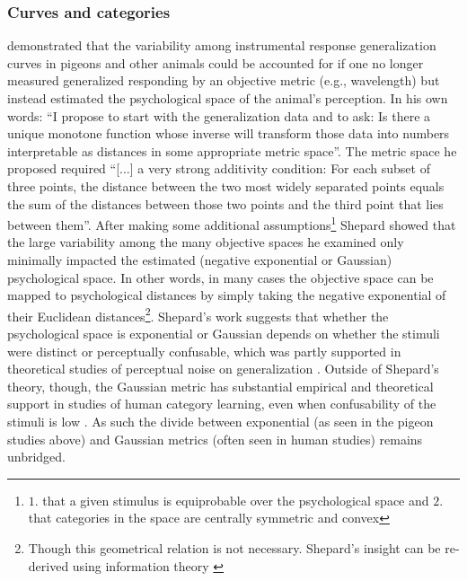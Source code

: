 \subsubsection{Curves and categories}
\label{subsub:curves}
\citet{Shepard:1987p9102} demonstrated that the variability among instrumental response generalization curves in pigeons and other animals could be accounted for if one no longer measured generalized responding by an objective metric (e.g., wavelength) but instead estimated the psychological space of the animal's perception.  In his own words: ``I propose to start with the generalization data and to ask: Is there a unique monotone function whose inverse will transform those data into numbers interpretable as distances in some appropriate metric space''. The metric space he proposed required ``[...] a very strong additivity condition: For each subset of three points, the distance between the two most widely separated points equals the sum of the distances between those two points and the third point that lies between them''.  After making some additional assumptions\footnote{
    $1.$ that a given stimulus is equiprobable over the psychological space and $2.$ that categories in the space are centrally symmetric and convex
} Shepard showed that the large variability among the many objective spaces he examined only minimally impacted the estimated (negative exponential or Gaussian) psychological space.  In other words, in many cases the objective space can be mapped to psychological distances by simply taking the negative exponential of their Euclidean distances\footnote{
    Though this geometrical relation is not necessary.  Shepard's insight can be re-derived using information theory \citep{Chatera:2003p9103}}.  
    Shepard's work suggests that whether the psychological space is exponential or Gaussian depends on whether the stimuli were distinct or perceptually confusable, which was partly supported in theoretical studies of perceptual noise on generalization \citep{Ennis:1988p9359}.  Outside of Shepard's theory, though, the Gaussian metric has substantial empirical and theoretical support in studies of human category learning, even when confusability of the stimuli is low \citep{Nosofsky:1985p9356,Medin:1978p9358}.  As such the divide between exponential (as seen in the pigeon studies above) and Gaussian metrics (often seen in human studies) remains unbridged.

